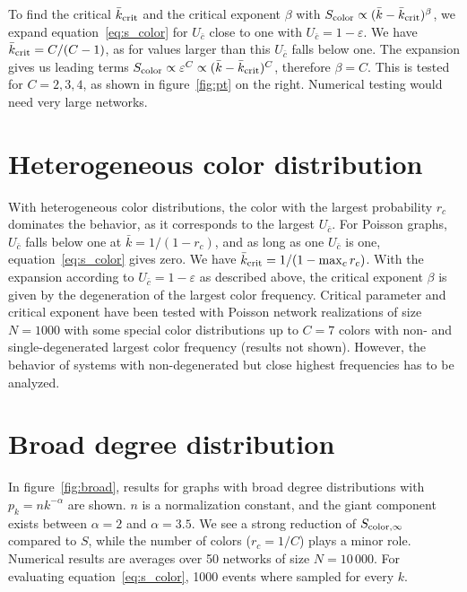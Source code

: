 \documentclass[aps, pre, onecolumn, a4paper, floatfix]{revtex4}
\begin{document}
To find the critical ${\bar k}_{\rm crit}$ and the critical exponent $\beta$ with 
$S_{\rm color}\propto ({\bar k}-{\bar k}_{\rm crit})^{\beta}$, we expand equation~\ref{eq:s_color} for $U_{\bar c}$ 
close to one with $U_{\bar c}=1-\varepsilon$. We have ${\bar k}_{\rm crit}=C/(C-1)$, as for values larger 
than this $U_{\bar c}$ falls below one. The expansion gives us leading terms 
$S_{\rm color}\propto \varepsilon^C \propto({\bar k}-{\bar k}_{\rm crit})^C$, therefore $\beta=C$. This is tested 
for $C=2,3,4$, as shown in figure~\ref{fig:pt} on the right. Numerical testing would need very large networks. 



\section*{Heterogeneous color distribution}

With heterogeneous color distributions, the color with the largest probability $r_c$ dominates 
the behavior, as it corresponds to the largest $U_{\bar c}$. For Poisson graphs, $U_{\bar c}$ 
falls below one at ${\bar k}=1/(1-r_c)$, and as long as one $U_{\bar c}$ is one, equation~\ref{eq:s_color}
gives zero. We have ${\bar k}_{\rm crit}=1/(1-\max_c r_c)$. With the expansion according to 
$U_{\bar c}=1-\varepsilon$ as described above, 
the critical exponent $\beta$ is given by the degeneration of the largest color frequency. Critical 
parameter and critical exponent have been tested with Poisson network realizations of size $N=1000$ 
with some special color distributions up to $C=7$ colors with non- and single-degenerated 
largest color frequency (results not shown). However, the 
behavior of systems with non-degenerated but close highest frequencies has to be analyzed. 



\section*{Broad degree distribution}

In figure~\ref{fig:broad}, results for graphs with broad degree distributions with 
$p_k=n k^{-\alpha}$ are shown. $n$ is a normalization constant, and the giant component 
exists between $\alpha=2$ and $\alpha=3.5$. We see a strong reduction of 
$S_{{\rm color},\infty}$ compared to $S$, while the number of colors ($r_c=1/C$) plays 
a minor role. Numerical results are averages over 50 networks of size $N=10\,000$. 
For evaluating equation~\ref{eq:s_color}, 1000 events where sampled for every $k$. 
\end{document}
